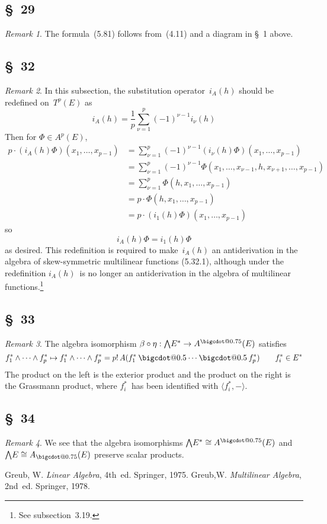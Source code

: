 \documentclass[letterpaper,12pt]{article}
\makeatletter
\newcommand{\iso}{\cong}
\newcommand{\bigcdot}[1]{\mathbin{\mathpalette\bigcdot@{#1}}}
\newcommand{\bigcdot@}[2]{%
  \sbox0{$#1\vcenter{}$}%
  \sbox2{$#1\cdot\m@th$}%
  \hbox{%
    \hfil
    \raise\ht0\hbox{%
      \scalebox{#2}{%
        \lower\ht0\hbox{$#1\bullet\m@th$}%
      }%
    }%
    \hfil
  }%
}
\newcommand{\after}{\circ}
\newcommand{\mult}{\cdot}
\newcommand{\eprod}{\wedge}
\newcommand{\bigeprod}{\bigwedge}
\newcommand{\medeprod}{{\textstyle\bigeprod}}
\newcommand{\fprod}{\bigcdot{0.5}}
\newcommand{\adot}{\bigcdot{0.75}}
\newcommand{\sprod}[2]{\langle#1,#2\rangle}
\newcommand{\multi}[4]{#2_{#3}#1\cdots#1#2_{#4}}
\newcommand{\eprods}[3]{\multi{\eprod}{#1}{#2}{#3}}
\newcommand{\fprods}[3]{\multi{\fprod}{#1}{#2}{#3}}
\theoremstyle{definition}
\theoremstyle{remark}
\newtheorem*{rmk}{Remark}
\makeatother
\begin{document}
\subsection*{\S~29}
\begin{rmk} The formula~(5.81) follows from~(4.11) and a diagram in \S~1 above.
\end{rmk}

\subsection*{\S~32}
\begin{rmk}
In this subsection, the substitution operator~\(i_A(h)\) should be redefined on~\(T^p(E)\) as
\[i_A(h)=\frac{1}{p}\sum_{\nu=1}^p(-1)^{\nu-1}i_{\nu}(h)\]
Then for \(\Phi\in A^p(E)\),
\begin{align*}
p\mult(i_A(h)\Phi)(x_1,\ldots,x_{p-1})&=\sum_{\nu=1}^p(-1)^{\nu-1}(i_{\nu}(h)\Phi)(x_1,\ldots,x_{p-1})\\
	&=\sum_{\nu=1}^p(-1)^{\nu-1}\Phi(x_1,\ldots,x_{\nu-1},h,x_{\nu+1},\ldots,x_{p-1})\\
	&=\sum_{\nu=1}^p\Phi(h,x_1,\ldots,x_{p-1})\\
	&=p\mult\Phi(h,x_1,\ldots,x_{p-1})\\
	&=p\mult(i_1(h)\Phi)(x_1,\ldots,x_{p-1})
\end{align*}
so
\[i_A(h)\Phi=i_1(h)\Phi\]
as desired. This redefinition is required to make~\(i_A(h)\) an antiderivation in the algebra of skew-symmetric multilinear functions (5.32.1), although under the redefinition \(i_A(h)\)~is no longer an antiderivation in the algebra of multilinear functions.\footnote{See subsection~3.19.}
\end{rmk}

\subsection*{\S~33}
\begin{rmk}
The algebra isomorphism \(\beta\after\eta:\medeprod E^*\to A^{\adot}(E)\) satisfies
\[\eprods{f^*}{1}{p}\mapsto\eprods{f^*}{1}{p}=p!\,A(\fprods{f^*}{1}{p})\qquad f^*_i\in E^*\]
The product on the left is the exterior product and the product on the right is the Grassmann product, where \(f^*_i\)~has been identified with \(\sprod{f^*_i}{-}\).
\end{rmk}

\subsection*{\S~34}
\begin{rmk}
We see that the algebra isomorphisms \(\medeprod E^*\iso A^{\adot}(E)\) and \(\medeprod E\iso A_{\adot}(E)\) preserve scalar products.
\end{rmk}

\newpage
\begin{thebibliography}{0}
 Greub, W. \textit{Linear Algebra}, 4th~ed. Springer, 1975.
 Greub,W. \textit{Multilinear Algebra}, 2nd~ed. Springer, 1978.
\end{thebibliography}
\end{document}
